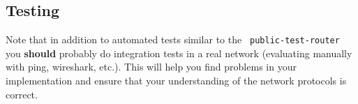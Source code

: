 \subsection{Testing}

Note that in addition to automated tests similar to the {\tt
  public-test-router} you {\bf should} probably do integration tests
in a real network (evaluating manually with ping, wireshark, etc.).
This will help you find problems in your implementation and ensure
that your understanding of the network protocols is correct.
